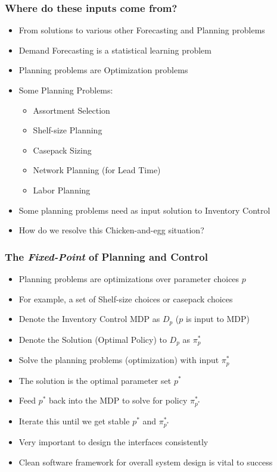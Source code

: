 \documentclass[handout]{beamer}
\begin{document}
\begin{frame}
\frametitle{Where do these inputs come from?}
\pause
\begin{itemize}[<+->]
\item From solutions to various other Forecasting and Planning problems
\item Demand Forecasting is a statistical learning problem
\item Planning problems are Optimization problems
\item Some Planning Problems:
\begin{itemize}
\item Assortment Selection
\item Shelf-size Planning
\item Casepack Sizing
\item Network Planning (for Lead Time)
\item Labor Planning
\end{itemize}
\item Some planning problems need as input solution to Inventory Control
\item How do we resolve this Chicken-and-egg situation?
\end{itemize}
\end{frame}

\begin{frame}
\frametitle{The {\em Fixed-Point} of Planning and Control}
\pause
\begin{itemize}[<+->]
\item Planning problems are optimizations over parameter choices $p$
\item For example, a set of Shelf-size choices or casepack choices
\item Denote the Inventory Control MDP as $D_p$ ($p$ is input to MDP)
\item Denote the Solution (Optimal Policy) to $D_p$ as $\pi^*_p$
\item Solve the planning problems (optimization) with input $\pi^*_p$
\item The solution is the optimal parameter set $p^*$
\item Feed $p^*$ back into the MDP to solve for policy $\pi^*_{p^*}$
\item Iterate this until we get stable $p^*$ and $\pi^*_{p^*}$
\item Very important to design the interfaces consistently
\item Clean software framework for overall system design is vital to success
\end{itemize}
\end{frame}
\end{document}

